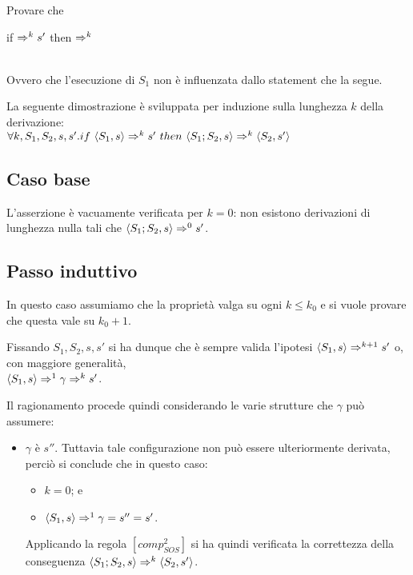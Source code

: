 {
  Provare che \\
  \centerline{if  $\Rightarrow^{k} s'$
  then  $\Rightarrow^{k}$ } \\
  Ovvero che l'esecuzione di $S_1$ non è influenzata dallo statement che la
  segue.
}
{
La seguente dimostrazione è sviluppata per induzione sulla lunghezza $k$ della
derivazione: \\

$\forall k,S_1,S_2,s,s'. if \mbox{ } \langle{}S_1, s\rangle{} \Rightarrow^{k} s' \mbox{ }
          then \mbox{ } \langle{}S_1; S_2, s\rangle{} \Rightarrow^{k} \langle{}S_2, s'\rangle{}$

\subsection{Caso base}

L'asserzione è vacuamente verificata per $k = 0$: non esistono derivazioni di
lunghezza nulla tali che $\langle{}S_1; S_2, s\rangle{} \Rightarrow^{0} s'$.

\subsection{Passo induttivo}

In questo caso assumiamo che la proprietà valga su ogni $k \leq k_0$ e si vuole
provare che questa vale su $k_0 + 1$.

Fissando $S_1, S_2, s, s'$ si ha dunque che è sempre valida l'ipotesi
$\langle{}S_1, s\rangle{} \Rightarrow^{k+1} s'$ o, con maggiore generalità, \\
$\langle{}S_1, s\rangle{} \Rightarrow^{1} \gamma{} \Rightarrow^{k} s'$.

Il ragionamento procede quindi considerando le varie strutture che $\gamma$ può
assumere:

\begin{itemize}
\item $\gamma$ è $s''$. Tuttavia tale configurazione non può essere
  ulteriormente derivata, perciò si conclude che in questo caso:
  \begin{itemize}
    \item $k = 0$; e
    \item $\langle{}S_1, s\rangle{} \Rightarrow^{1} \gamma{} = s'' = s'$.
  \end{itemize}

  Applicando la regola $[comp^2_{SOS}]$ si ha quindi verificata la correttezza
  della conseguenza $\langle{}S_1; S_2, s\rangle{} \Rightarrow^{k} \langle{}S_2, s'\rangle{}$.


\end{itemize}}
